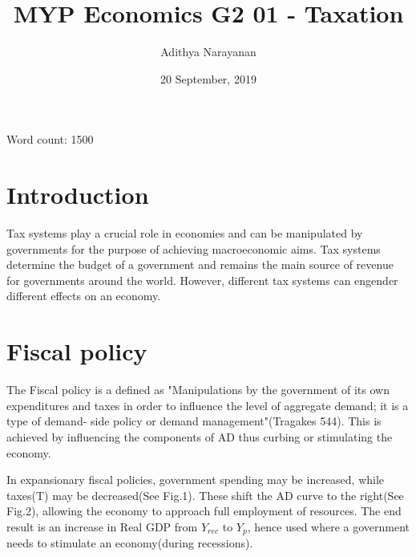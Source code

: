 \documentclass[12pt, a4paper]{article}
\title{MYP Economics G2 01 - Taxation}
\author{Adithya Narayanan}
\date{20 September, 2019}
\begin{document}
	\begin{titlepage}
		\maketitle
		\begin{center}
			Word count: 1500
		\end{center}
	\end{titlepage}
	\tableofcontents
	\newpage
	\section{Introduction}
	Tax systems play a crucial role in economies and can be manipulated by governments for the purpose of achieving macroeconomic aims. Tax systems determine the budget of a government and remains the main source of revenue for governments around the world. However, different tax systems can engender different effects on an economy.
	\section{Fiscal policy}
	The Fiscal policy is a defined as "Manipulations by the government of its own expenditures and taxes in order to influence the level of aggregate demand; it is a type of demand- side policy or demand management"(Tragakes 544). This is achieved by influencing the components of AD thus curbing or stimulating the economy.
	\newline
	
	In expansionary fiscal policies, government spending may be increased, while taxes(T) may be decreased(See Fig.1). These shift the AD curve to the right(See Fig.2), allowing the economy to approach full employment of resources. The end result is an increase in Real GDP from $ Y_{rec} $ to $ Y_{p} $, hence used where a government needs to stimulate an economy(during recessions).
	
\end{document}
